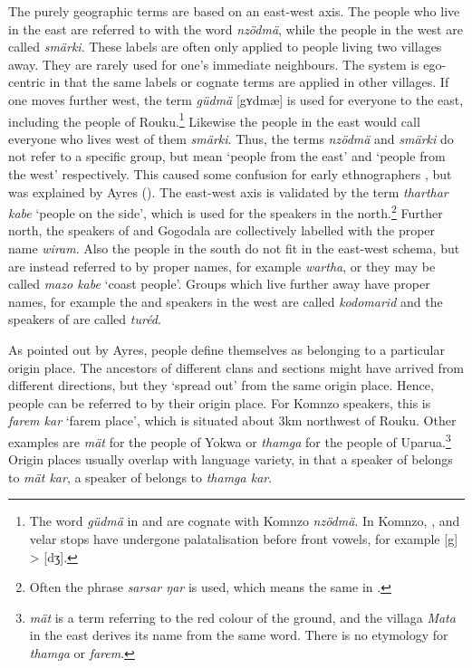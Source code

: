 The purely geographic terms are based on an east-west axis. The people who live in the east are referred to with the word \emph{nzödmä}, while the people in the west are called \emph{smärki}. These labels are often only applied to people living two villages away. They are rarely used for one's immediate neighbours. The system is ego-centric in that the same labels or cognate terms are applied in other villages. If one moves further west, the term \emph{güdmä} [gʏdmæ] is used for everyone to the east, including the people of Rouku.\footnote{The word \emph{güdmä} in  and  are cognate with Komnzo \emph{nzödmä}. In Komnzo, ,  and  velar stops have undergone palatalisation before front vowels, for example [g] > [dʒ].} Likewise the people in the east would call everyone who lives west of them \emph{smärki}. Thus, the terms \emph{nzödmä} and \emph{smärki} do not refer to a specific group, but mean `people from the east' and `people from the west' respectively. This caused some confusion for early ethnographers \citep[36]{Williams:1936transfly}, but was explained by Ayres (\citeyear[132]{Ayres:ws}). The east-west axis is validated by the term \emph{tharthar kabe} `people on the side', which is used for the  speakers in the north.\footnote{Often the phrase \emph{sarsar ŋar} is used, which means the same in .} Further north, the speakers of  and Gogodala are collectively labelled with the proper name \emph{wiram}. Also the people in the south do not fit in the east-west schema, but are instead referred to by proper names, for example \emph{wartha}, or they may be called \emph{mazo kabe} `coast people'. Groups which live further away have proper names, for example the  and  speakers in the west are called \emph{kodomarid} and the speakers of  are called \emph{turéd}.%

As pointed out by Ayres, people define themselves as belonging to a particular origin place. The ancestors of different clans and sections might have arrived from different directions, but they `spread out' from the same origin place. Hence, people can be referred to by their origin place. For Komnzo speakers, this is \emph{farem kar} `farem place', which is situated about 3km northwest of Rouku. Other examples are \emph{mät} for the people of Yokwa or \emph{thamga} for the people of Uparua.\footnote{\emph{mät} is a term referring to the red colour of the ground, and the villaga \emph{Mata} in the east derives its name from the same word. There is no etymology for \emph{thamga} or \emph{farem}.} Origin places usually overlap with language variety, in that a speaker of  belongs to \emph{mät kar}, a speaker of  belongs to \emph{thamga kar}.%

